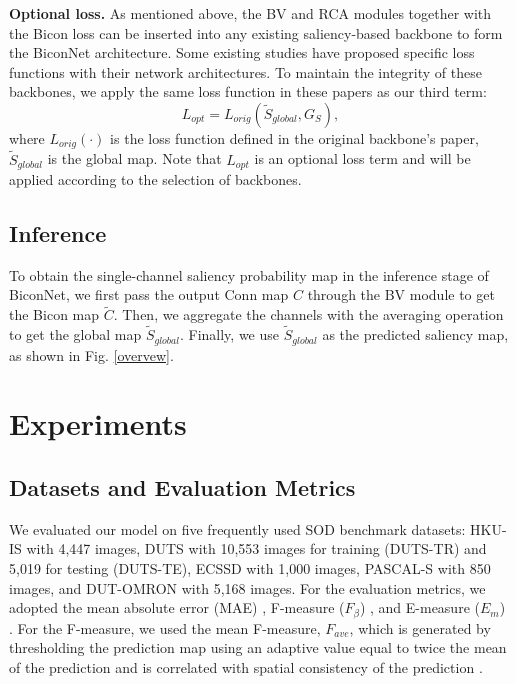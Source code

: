 \documentclass[final]{cvpr}
\begin{document}
\textbf{Optional loss.} As mentioned above, the BV and RCA modules together with the Bicon loss can be inserted into any existing saliency-based backbone to form the BiconNet architecture. Some existing studies \cite{basnet,MINet} have proposed specific loss functions with their network architectures. To maintain the integrity of these backbones, we apply the same loss function in these papers as our third term:
\begin{equation}
{L_{opt}} = {L_{orig}}({\widetilde S_{global}},{G_S}),
\end{equation}
where $L_{orig}(\cdot)$ is the loss function defined in the original backbone’s paper, $\widetilde{S}_{global}$ is the global map. Note that $L_{opt}$ is an optional loss term and will be applied according to the selection of backbones. 
\subsection{Inference}
To obtain the single-channel saliency probability map in the inference stage of BiconNet, we first pass the output Conn map $C$ through the BV module to get the Bicon map $\widetilde{C}$. Then, we aggregate the channels with the averaging operation to get the global map $\widetilde S_{global}$. Finally, we use $\widetilde S_{global}$ as the predicted saliency map, as shown in Fig. \ref{overvew}.


\section{Experiments}
\subsection{Datasets and Evaluation Metrics}
We evaluated our model on five frequently used SOD benchmark datasets: HKU-IS \cite{HKU} with 4,447 images, DUTS \cite{duts} with 10,553 images for training (DUTS-TR) and 5,019 for testing (DUTS-TE), ECSSD \cite{ecssd} with 1,000 images, PASCAL-S \cite{pascal} with 850 images, and DUT-OMRON \cite{omron} with 5,168 images. For the evaluation metrics, we adopted the mean absolute error (MAE) \cite{mae}, F-measure ($F_\beta$)  \cite{F-measure}, and E-measure ($E_m$) \cite{Emeasure}.  For the F-measure, we used the mean F-measure, $F_{ave}$, which is generated by thresholding the prediction map using an adaptive value equal to twice the mean of the prediction and is correlated with spatial consistency of the prediction \cite{cpd}.%
\end{document}
